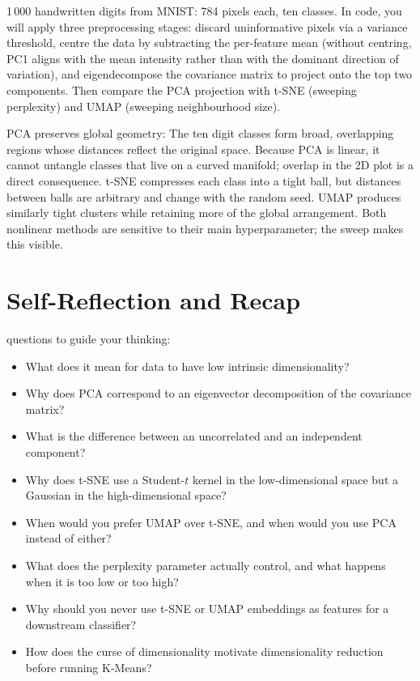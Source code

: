 
 1\,000 handwritten digits from MNIST: 784 pixels each, ten classes.
In code, you will apply three preprocessing stages:
discard uninformative pixels via a variance threshold,
centre the data by subtracting the per-feature mean (without centring, PC1 aligns with the mean intensity rather than with the dominant direction of variation),
and eigendecompose the covariance matrix to project onto the top two components.
Then compare the PCA projection with t-SNE (sweeping perplexity) and UMAP (sweeping neighbourhood size).

PCA preserves global geometry: The ten digit classes form broad, overlapping regions whose distances reflect the original space.
Because PCA is linear, it cannot untangle classes that live on a curved manifold; overlap in the 2D plot is a direct consequence.
t-SNE compresses each class into a tight ball, but distances between balls are arbitrary and change with the random seed.
UMAP produces similarly tight clusters while retaining more of the global arrangement.
Both nonlinear methods are sensitive to their main hyperparameter; the sweep makes this visible.



\section{Self-Reflection and Recap}

 questions to guide your thinking:
\begin{itemize}
    \item What does it mean for data to have low intrinsic dimensionality?
    \item Why does PCA correspond to an eigenvector decomposition of the covariance matrix?
    \item What is the difference between an uncorrelated and an independent component?
    \item Why does t-SNE use a Student-$t$ kernel in the low-dimensional space but a Gaussian in the high-dimensional space?
    \item When would you prefer UMAP over t-SNE, and when would you use PCA instead of either?
    \item What does the perplexity parameter actually control, and what happens when it is too low or too high?
    \item Why should you never use t-SNE or UMAP embeddings as features for a downstream classifier?
    \item How does the curse of dimensionality motivate dimensionality reduction before running K-Means?
\end{itemize}

